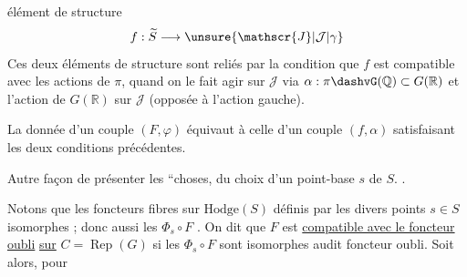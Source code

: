  élément de structure
\[
f:\widetilde{S}\longrightarrow\unsure{\mathscr{J}|\mathcal{J}|\gamma}
\]
Ces deux éléments de structure sont reliés par la condition que $f$ est compatible avec les actions de $\pi$, quand on le fait agir sur $\mathscr{J}$ via $\alpha:\pi\dashvG(\mathbb{Q})\subset G(\mathbb{R})$ et l'action  de $G(\mathbb{R})$ sur $\mathscr{J}$ (opposée à l'action gauche).

La donnée d'un couple $(F,\varphi)$ équivaut à celle d'un couple $(f,\alpha)$ satisfaisant les deux conditions précédentes.


Autre façon de présenter les ``choses,  du choix d'un point-base $s$ de $S$. .

 Notons que les foncteurs fibres  sur  $\mathrm{Hodge}(S)$ définis par les divers points $s\in S$   isomorphes ; donc aussi les $\Phi_s\circ F$ . On dit que  $F$ est \uline{compatible avec le foncteur} \uline{oubli} \uline{sur} $C=\operatorname{Rep}(G)$ si les $\Phi_s\circ F$ sont isomorphes audit foncteur oubli. Soit alors, pour

